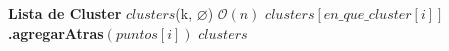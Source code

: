 \begin{algorithm}[H]
	\caption{\Comment $\mathcal{O}(n)$}
	\begin{algorithmic}[1]
		\State \textbf{Lista de Cluster} $clusters$(k, $\varnothing$)
		\Statex
		\Comment $\mathcal{O}(n)$
		\State $clusters[en\_que\_cluster[i]]$\textbf{.agregarAtras}$(puntos[i])$
		\EndFor
		\Statex
		\State \Return $clusters$
		\EndFunction
	\end{algorithmic}
\end{algorithm}